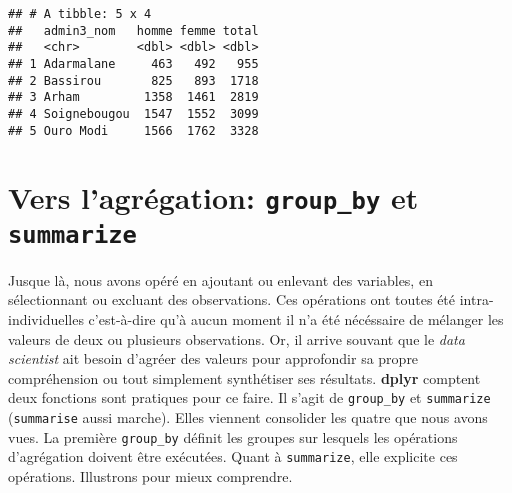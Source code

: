 \documentclass[]{book}
\newenvironment{Shaded}{\begin{snugshade}}{\end{snugshade}}
\newcommand{\KeywordTok}[1]{\textcolor[rgb]{0.13,0.29,0.53}{\textbf{#1}}}
\newcommand{\DataTypeTok}[1]{\textcolor[rgb]{0.13,0.29,0.53}{#1}}
\newcommand{\DecValTok}[1]{\textcolor[rgb]{0.00,0.00,0.81}{#1}}
\newcommand{\StringTok}[1]{\textcolor[rgb]{0.31,0.60,0.02}{#1}}
\newcommand{\CommentTok}[1]{\textcolor[rgb]{0.56,0.35,0.01}{\textit{#1}}}
\newcommand{\OperatorTok}[1]{\textcolor[rgb]{0.81,0.36,0.00}{\textbf{#1}}}
\newcommand{\NormalTok}[1]{#1}
\begin{document}
\begin{Shaded}
\end{Shaded}

\begin{verbatim}
## # A tibble: 5 x 4
##   admin3_nom   homme femme total
##   <chr>        <dbl> <dbl> <dbl>
## 1 Adarmalane     463   492   955
## 2 Bassirou       825   893  1718
## 3 Arham         1358  1461  2819
## 4 Soignebougou  1547  1552  3099
## 5 Ouro Modi     1566  1762  3328
\end{verbatim}

\section{\texorpdfstring{Vers l'agrégation: \texttt{group\_by} et
\texttt{summarize}}{Vers l'agrégation: group\_by et summarize}}\label{vers-lagregation-group_by-et-summarize}

Jusque là, nous avons opéré en ajoutant ou enlevant des variables, en
sélectionnant ou excluant des observations. Ces opérations ont toutes
été intra-individuelles c'est-à-dire qu'à aucun moment il n'a été
nécéssaire de mélanger les valeurs de deux ou plusieurs observations.
Or, il arrive souvant que le \emph{data scientist} ait besoin d'agréer
des valeurs pour approfondir sa propre compréhension ou tout simplement
synthétiser ses résultats. \textbf{dplyr} comptent deux fonctions sont
pratiques pour ce faire. Il s'agit de \texttt{group\_by} et
\texttt{summarize} (\texttt{summarise} aussi marche). Elles viennent
consolider les quatre que nous avons vues. La première
\texttt{group\_by} définit les groupes sur lesquels les opérations
d'agrégation doivent être exécutées. Quant à \texttt{summarize}, elle
explicite ces opérations. Illustrons pour mieux comprendre.
\end{document}

